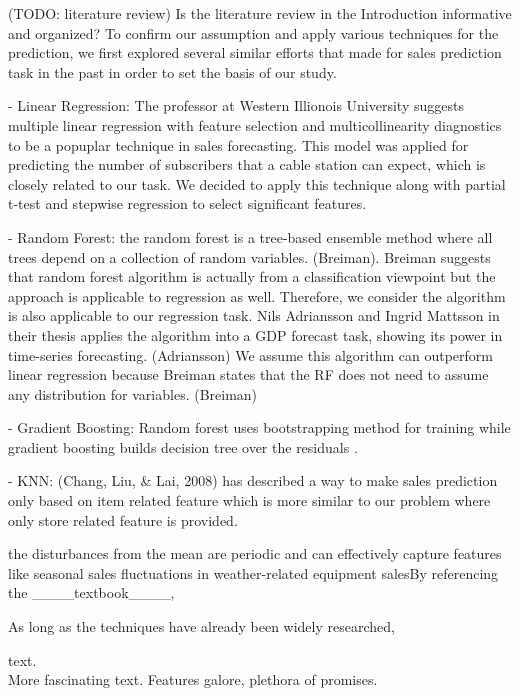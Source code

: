 \documentclass[letterpaper,twocolumn,10pt]{article}
\begin{document}
(TODO: literature review) Is the literature review in the Introduction informative and organized?
To confirm our assumption and apply various techniques for the prediction, we first explored several similar efforts that made for sales prediction task in the past in order to set the basis of our study. 

- Linear Regression: The professor at Western Illionois University suggests multiple linear regression with feature selection and multicollinearity diagnostics to be a popuplar technique in sales forecasting. This model was applied for predicting the number of subscribers that a cable station can expect, which is closely related to our task. We decided to apply this technique along with partial t-test and stepwise regression to select significant features. 

- Random Forest: the random forest is a tree-based ensemble method where all trees depend on a collection of random variables. (Breiman). Breiman suggests that random forest algorithm is actually from a classification viewpoint but the approach is
applicable to regression as well. Therefore, we consider the algorithm is also applicable to our regression task. Nils Adriansson and Ingrid Mattsson in their thesis applies the algorithm into a GDP forecast task, showing its power in time-series forecasting. (Adriansson) We assume this algorithm can outperform linear regression because Breiman states that the RF does not need to assume any distribution for variables. (Breiman)

- Gradient Boosting: Random forest uses bootstrapping method for training while gradient boosting builds decision
tree over the residuals .

- KNN: (Chang, Liu, & Lai, 2008) has described a way to make
sales prediction only based on item related feature which is
more similar to our problem where only store related feature
is provided. 


the disturbances
from the mean are periodic and can effectively capture features like seasonal sales fluctuations in weather-related
equipment salesBy referencing the ____textbook____, 


As long as the techniques have already been widely researched, 

text. \\

More fascinating text. Features galore, plethora of promises.\\
\end{document}
